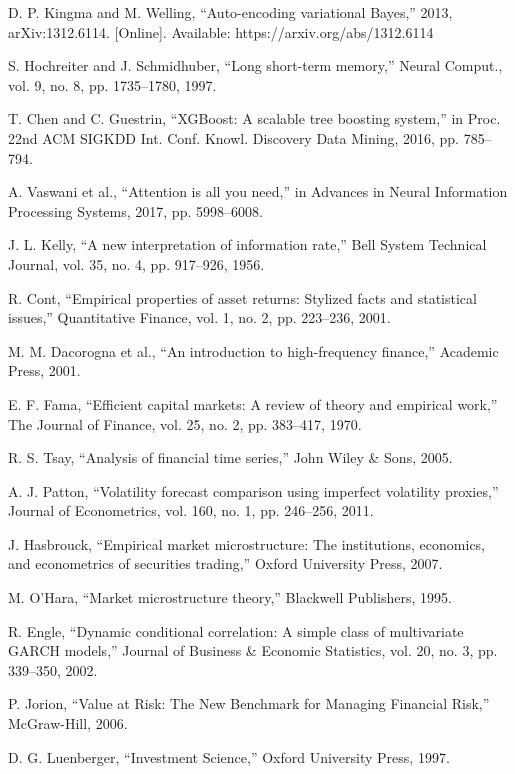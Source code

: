 \documentclass[conference]{IEEEtran}
\begin{document}
\begin{thebibliography}{00}
 D. P. Kingma and M. Welling, ``Auto-encoding variational Bayes,'' 2013, arXiv:1312.6114. [Online]. Available: https://arxiv.org/abs/1312.6114

 S. Hochreiter and J. Schmidhuber, ``Long short-term memory,'' Neural Comput., vol. 9, no. 8, pp. 1735--1780, 1997.

 T. Chen and C. Guestrin, ``XGBoost: A scalable tree boosting system,'' in Proc. 22nd ACM SIGKDD Int. Conf. Knowl. Discovery Data Mining, 2016, pp. 785--794.

 A. Vaswani et al., ``Attention is all you need,'' in Advances in Neural Information Processing Systems, 2017, pp. 5998--6008.

 J. L. Kelly, ``A new interpretation of information rate,'' Bell System Technical Journal, vol. 35, no. 4, pp. 917--926, 1956.

 R. Cont, ``Empirical properties of asset returns: Stylized facts and statistical issues,'' Quantitative Finance, vol. 1, no. 2, pp. 223--236, 2001.

 M. M. Dacorogna et al., ``An introduction to high-frequency finance,'' Academic Press, 2001.

 E. F. Fama, ``Efficient capital markets: A review of theory and empirical work,'' The Journal of Finance, vol. 25, no. 2, pp. 383--417, 1970.

 R. S. Tsay, ``Analysis of financial time series,'' John Wiley \& Sons, 2005.

 A. J. Patton, ``Volatility forecast comparison using imperfect volatility proxies,'' Journal of Econometrics, vol. 160, no. 1, pp. 246--256, 2011.

 J. Hasbrouck, ``Empirical market microstructure: The institutions, economics, and econometrics of securities trading,'' Oxford University Press, 2007.

 M. O'Hara, ``Market microstructure theory,'' Blackwell Publishers, 1995.

 R. Engle, ``Dynamic conditional correlation: A simple class of multivariate GARCH models,'' Journal of Business \& Economic Statistics, vol. 20, no. 3, pp. 339--350, 2002.

 P. Jorion, ``Value at Risk: The New Benchmark for Managing Financial Risk,'' McGraw-Hill, 2006.

 D. G. Luenberger, ``Investment Science,'' Oxford University Press, 1997.


\end{thebibliography}
\end{document}

